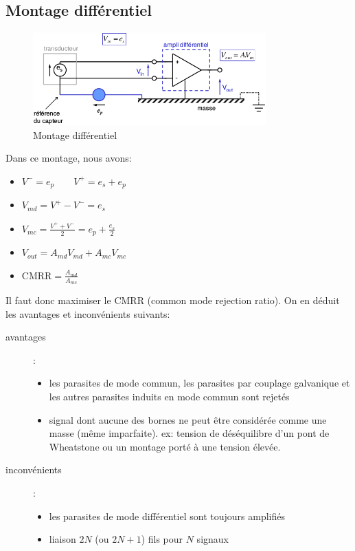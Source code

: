 \subsection{Montage différentiel}
\begin{figure}[H] 
	\centering 
	\includegraphics[width=0.8\textwidth,height=10\baselineskip,keepaspectratio]{ch3/image13} 
	\caption{Montage différentiel} 
\end{figure}
Dans ce montage, nous avons:
\begin{itemize}
		\item { \(V^-=e_p\qquad V^+=e_s+e_p\)} 
		\item { \(V_{md} = V^+-V^-=e_s\)} 
		\item { \(V_{mc}=\frac{V^++V^-}{2}=e_p+\frac{e_s}{2}\)} 
		\item { \(V_{out}=A_{md}V_{md}+A_{mc}V_{mc}\)} 
		\item { \(\text{CMRR} = \frac{A_{md}}{A_{mc}}\)} 
\end{itemize}
Il faut donc maximiser le CMRR (common mode rejection ratio). On en déduit les avantages et inconvénients suivants:
\begin{description}
	\item[avantages]:
	\begin{itemize}
		\item les parasites de mode commun, les parasites par couplage galvanique et les autres parasites induits en mode commun sont rejetés
		\item signal dont aucune des bornes ne peut être considérée comme une masse (même imparfaite). ex: tension de déséquilibre d'un pont de Wheatstone ou un montage porté à une tension élevée.
	\end{itemize}
	\item [inconvénients]:
	\begin{itemize}
		\item les parasites de mode différentiel sont toujours amplifiés
		\item liaison \(2N\) (ou \(2N+1\)) fils pour \(N\) signaux
	\end{itemize}
\end{description}
